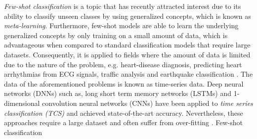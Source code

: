 \textit{Few-shot classification} is a topic that has recently attracted interest due to its ability to classify unseen classes by using generalized concepts, which is known as \textit{meta-learning}. Furthermore, few-shot models are able to learn the underlying generalized concepts by only training on a small amount of data, which is advantageous when compared to standard classification models that require large datasets. Consequently, it is applied to fields where the amount of data is limited due to the nature of the problem, e.g. heart-disease diagnosis, predicting heart arrhythmias from ECG signals, traffic analysis and earthquake classification \cite{inpr_DBLP2020, narwariya2020}. 
The data of the aforementioned problems is known as time-series data. Deep neural networks (DNNs) such as, long short term memory networks (LSTMs) and 1-dimensional convolution neural networks (CNNs) have been applied to \textit{time series classification (TCS)} and achieved state-of-the-art accuracy. Nevertheless, these approaches require a large dataset and often suffer from over-fitting \cite{narwariya2020}. 
Few-shot classification

    

